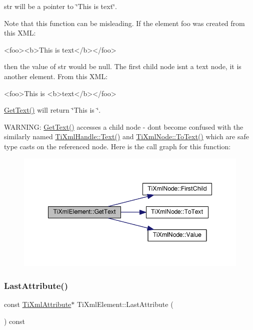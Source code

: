 \textquotesingle{}str\textquotesingle{} will be a pointer to \char`\"{}\+This is text\char`\"{}.

Note that this function can be misleading. If the element foo was created from this X\+ML\+: \begin{DoxyVerb}<foo><b>This is text</b></foo> 
\end{DoxyVerb}


then the value of str would be null. The first child node isn\textquotesingle{}t a text node, it is another element. From this X\+ML\+: \begin{DoxyVerb}<foo>This is <b>text</b></foo> 
\end{DoxyVerb}
 \hyperlink{class_ti_xml_element_af0f814ecbd43d50d4cdbdf4354d3da39}{Get\+Text()} will return \char`\"{}\+This is \char`\"{}.

W\+A\+R\+N\+I\+NG\+: \hyperlink{class_ti_xml_element_af0f814ecbd43d50d4cdbdf4354d3da39}{Get\+Text()} accesses a child node -\/ don\textquotesingle{}t become confused with the similarly named \hyperlink{class_ti_xml_handle_ad3b502c72059421e4dfcc7bda3c392fe}{Ti\+Xml\+Handle\+::\+Text()} and \hyperlink{class_ti_xml_node_a3ddfbcac78fbea041fad57e5c6d60a03}{Ti\+Xml\+Node\+::\+To\+Text()} which are safe type casts on the referenced node. Here is the call graph for this function\+:
\nopagebreak
\begin{figure}[H]
\begin{center}
\leavevmode
\includegraphics[width=348pt]{class_ti_xml_element_af0f814ecbd43d50d4cdbdf4354d3da39_cgraph}
\end{center}
\end{figure}
\mbox{\label{class_ti_xml_element_a42939f55ed4cec5fc1daaecfded7ba16}} 
\subsubsection{\texorpdfstring{Last\+Attribute()}{LastAttribute()}\hspace{0.1cm}{\footnotesize\ttfamily [1/2]}}
{\footnotesize\ttfamily const \hyperlink{class_ti_xml_attribute}{Ti\+Xml\+Attribute}$\ast$ Ti\+Xml\+Element\+::\+Last\+Attribute (\begin{DoxyParamCaption}{ }\end{DoxyParamCaption}) const\hspace{0.3cm}{\ttfamily [inline]}}



